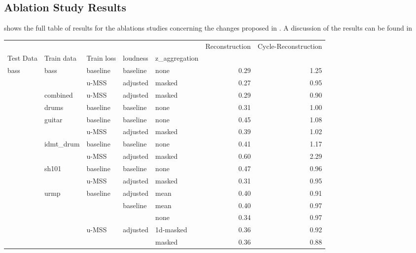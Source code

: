 \begin{theappendices}
\section{Ablation Study Results}
 shows the full table of results for the ablations studies concerning the changes proposed in . A discussion of the results can be found in 

    \begin{longtable}{lllllrr}
        \toprule
     &      &       &          &      &  Reconstruction &  Cycle-Reconstruction \\
Test Data & Train data & Train loss & loudness & z\_aggregation &                 &                       \\
\midrule
bass & bass & baseline & baseline & none &            0.29 &                  1.25 \\
     &      & u-MSS & adjusted & masked &            0.27 &                  0.95 \\
     & combined & u-MSS & adjusted & masked &            0.29 &                  0.90 \\
     & drums & baseline & baseline & none &            0.31 &                  1.00 \\
     & guitar & baseline & baseline & none &            0.45 &                  1.08 \\
     &      & u-MSS & adjusted & masked &            0.39 &                  1.02 \\
     & idmt\_drum & baseline & baseline & none &            0.41 &                  1.17 \\
     &      & u-MSS & adjusted & masked &            0.60 &                  2.29 \\
     & sh101 & baseline & baseline & none &            0.47 &                  0.96 \\
     &      & u-MSS & adjusted & masked &            0.31 &                  0.95 \\
     & urmp & baseline & adjusted & mean &            0.40 &                  0.91 \\
     &      &       & baseline & mean &            0.40 &                  0.97 \\
     &      &       &          & none &            0.34 &                  0.97 \\
     &      & u-MSS & adjusted & 1d-masked &            0.36 &                  0.92 \\
     &      &       &          & masked &            0.36 &                  0.88 \\

\end{longtable}
\end{theappendices}
